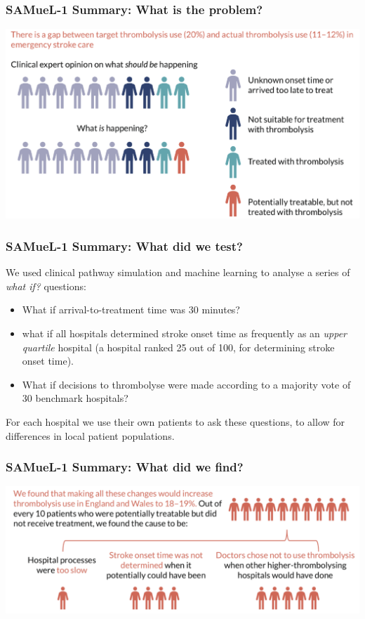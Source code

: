 \documentclass[xcolor={usenames,dvipsnames}]{beamer}
\begin{document}

\begin{frame}
\frametitle{SAMueL-1 Summary: What is the problem?}
\begin{center}
\includegraphics[width=1.0\textwidth]{./images/sam_summary_pt_1}
\end{center}
\end{frame}

\begin{frame}
\frametitle{SAMueL-1 Summary: What did we test?}

We used clinical pathway simulation and machine learning to analyse a series of \emph{what if?} questions:

\begin{itemize}
    \setlength\itemsep{3mm}
    \item What if arrival-to-treatment time was 30 minutes?
    \item what if all hospitals determined stroke onset time as frequently as an \emph{upper quartile} hospital (a hospital ranked 25 out of 100, for determining stroke onset time).
    \item What if decisions to thrombolyse were made according to a majority vote of 30 benchmark hospitals?
\end{itemize}

For each hospital we use their own patients to ask these questions, to allow for differences in local patient populations.
\end{frame}

\begin{frame}
\frametitle{SAMueL-1 Summary: What did we find?}
\begin{center}
\includegraphics[width=1.0\textwidth]{./images/sam_summary_pt_3}
\end{center}
\end{frame}
\end{document}
